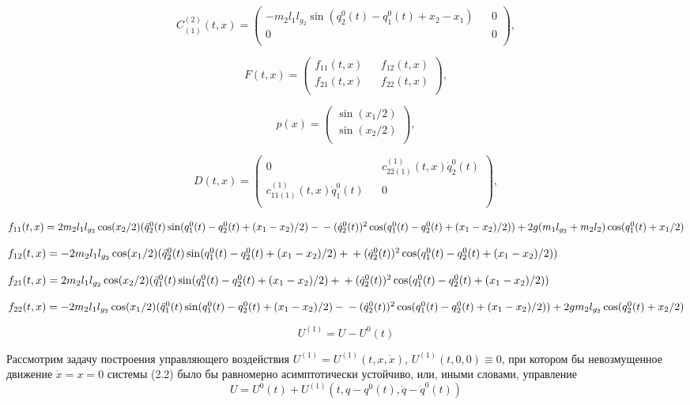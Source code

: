 $$C_{(1)}^{(2)}(t, x) =
\begin{pmatrix}
- m_2 l_1 l_{g_2} \sin(q_2^0(t) - q_1^0(t) + x_2 - x_1) && 0 \\
0 && 0\\
\end{pmatrix},$$

$$F(t, x) =
\begin{pmatrix}
f_{11}(t,x) && f_{12}(t,x) \\
f_{21}(t,x) && f_{22}(t,x)\\
\end{pmatrix},$$

$$p(x) =
\begin{pmatrix}
\sin(x_1/2) \\
\sin(x_2/2)\\
\end{pmatrix},$$

$$D(t, x) =
\begin{pmatrix}
0 && c_{22(1)}^{(1)}(t,x) \dot q_2^0(t) \\
c_{11(1)}^{(1)}(t,x) \dot q_1^0(t) && 0 \\
\end{pmatrix},$$

$f_{11}(t,x) = 2m_2l_1l_{g_2} \cos(x_2/2) (\ddot q_2^0(t) \sin(q_1^0(t) - q_2^0(t) + (x_1 - x_2)/2) - \\ - (\dot q_2^0(t))^2 \cos(q_1^0(t) - q_2^0(t) + (x_1 - x_2)/2)) + 2g(m_1 l_{g_2} + m_2 l_2) \cos(q_1^0(t) + x_1/2)$

$f_{12}(t,x) = - 2 m_2 l_1 l_{g_2} \cos(x_1/2) (\ddot q_2^0(t) \sin(q_1^0(t) - q_2^0(t) + (x_1 - x_2)/2) + \\ + (\dot q_2^0(t))^2 \cos(q_1^0(t) - q_2^0(t) + (x_1 - x_2)/2))$

$f_{21}(t,x) = 2 m_2 l_1 l_{g_2} \cos(x_2/2) (\ddot q_1^0(t) \sin(q_1^0(t) - q_2^0(t) + (x_1 - x_2)/2) + \\ + (\dot q_2^0(t))^2 \cos(q_1^0(t) - q_2^0(t) + (x_1 - x_2)/2))$

$f_{22}(t,x) = - 2m_2 l_1 l_{g_2} \cos(x_1/2) (\ddot q_1^0(t) \sin(q_1^0(t) - q_2^0(t) + (x_1 - x_2)/2) - \\ - (\dot q_2^0(t))^2 \cos(q_1^0(t) - q_2^0(t) + (x_1 - x_2)/2)) + 2 g m_2 l_{g_2} \cos(q_2^0(t) + x_2/2)$

$$ U^{(1)} = U - U^{0}(t) $$

Рассмотрим задачу построения управляющего воздействия  $ U^{(1)} = U^{(1)}(t, x, \dot x) $, $ U^{(1)} (t, 0, 0) \equiv 0 $, при котором бы невозмущенное движение $\dot x = x = 0$  системы (2.2) было бы равномерно асимптотически устойчиво, или, иными словами, управление $$U = U^0(t) + U^{(1)}(t, q-q^0(t), \dot q - \dot q^0(t))$$

